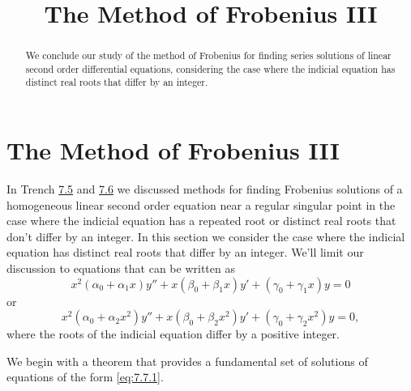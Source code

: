 \documentclass{ximera}
\title{The Method of Frobenius III}%
\begin{document}
\begin{abstract}
We conclude our study of the method of Frobenius for finding series solutions of linear second order differential equations, considering the case where the indicial equation has distinct real roots that differ by an integer.
\end{abstract}

\maketitle

\section*{The Method of Frobenius III}

In Trench \href{https://ximera.osu.edu/ode/main/frobeniusI/frobeniusI}{7.5} and \href{https://ximera.osu.edu/ode/main/frobeniusII/frobeniusII}{7.6} we discussed methods
for finding
Frobenius solutions of a homogeneous linear second order equation near
a regular singular point in the case where the indicial equation has a
repeated root or distinct real roots that don't differ by an integer.
In this section we consider the case where the indicial equation has
distinct real roots that differ by an integer. We'll limit our
discussion to equations that can be written as
\begin{equation} \label{eq:7.7.1}
x^2(\alpha_0+\alpha_1x)y''+x(\beta_0+\beta_1x)y'
+(\gamma_0+\gamma_1x)y=0
\end{equation}
or
$$
x^2(\alpha_0+\alpha_2x^2)y''+x(\beta_0+\beta_2x^2)y'
+(\gamma_0+\gamma_2x^2)y=0,
$$
where the roots of the indicial equation differ by a positive integer.

We begin with a theorem that provides a fundamental set of solutions
of equations of the form \eqref{eq:7.7.1}.
\end{document}
